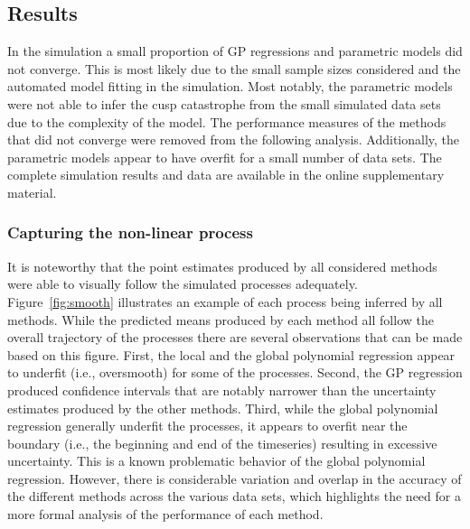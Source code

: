 \documentclass[man, floatsintext]{apa7}
\begin{document}
\subsection{Results}

In the simulation a small proportion of GP regressions and parametric models
did not converge. This is most likely due to the small sample sizes considered
and the automated model fitting in the simulation. Most notably, the parametric
models were not able to infer the cusp catastrophe from the small simulated
data sets due to the complexity of the model. The performance measures of the
methods that did not converge were removed from the following analysis.
Additionally, the parametric models appear to have overfit for a small number
of data sets. The complete simulation results and data are available in the
online supplementary material.

\subsubsection{Capturing the non-linear process}

It is noteworthy that the point estimates produced by all considered methods
were able to visually follow the simulated processes adequately.
Figure~\ref{fig:smooth} illustrates an example of each process being inferred
by all methods. While the predicted means produced by each method all follow
the overall trajectory of the processes there are several observations that can
be made based on this figure. First, the local and the global polynomial
regression appear to underfit (i.e., oversmooth) for some of the processes.
Second, the GP regression produced confidence intervals that are notably
narrower than the uncertainty estimates produced by the other methods. Third,
while the global polynomial regression generally underfit the processes, it
appears to overfit near the boundary (i.e., the beginning and end of the
timeseries) resulting in excessive uncertainty. This is a known problematic
behavior of the global polynomial regression. However, there is considerable
variation and overlap in the accuracy of the different methods across the
various data sets, which highlights the need for a more formal analysis of the
performance of each method.

\begin{sidewaysfigure*}[htbp]
  \caption{Example processes inferred by each of the introduced methods}
  \label{fig:smooth}
\end{sidewaysfigure*}
\end{document}
